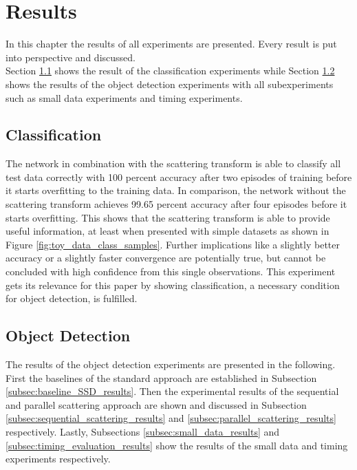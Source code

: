 \chapter{Results}
\label{chap:results}

In this chapter the results of all experiments are presented. Every result is put into perspective and discussed. \\
Section \ref{sec:classification_results} shows the result of the classification experiments while Section \ref{sec:object_detection_results} shows the results of the object detection experiments with all subexperiments such as small data experiments and timing experiments. 

\section{Classification}
\label{sec:classification_results}

The network in combination with the scattering transform is able to classify all test data correctly with 100 percent accuracy after two episodes of training before it starts overfitting to the training data. In comparison, the network without the scattering transform achieves 99.65 percent accuracy after four episodes before it starts overfitting. This shows that the scattering transform is able to provide useful information, at least when presented with simple datasets as shown in Figure \ref{fig:toy_data_class_samples}. Further implications like a slightly better accuracy or a slightly faster convergence are potentially true, but cannot be concluded with high confidence from this single observations. This experiment gets its relevance for this paper by showing classification, a necessary condition for object detection, is fulfilled.

\section{Object Detection}
\label{sec:object_detection_results}
The results of the object detection experiments are presented in the following. First the baselines of the standard approach are established in Subsection \ref{subsec:baseline_SSD_results}. Then the experimental results of the sequential and parallel scattering approach are shown and discussed in Subsection \ref{subsec:sequential_scattering_results} and \ref{subsec:parallel_scattering_results} respectively. Lastly, Subsections \ref{subsec:small_data_results} and \ref{subsec:timing_evaluation_results} show the results of the small data and timing experiments respectively. 

